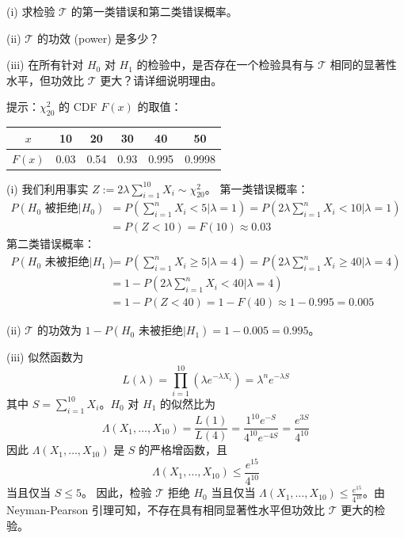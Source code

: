 \begin{questions}
(i) 求检验 $\mathcal{T}$ 的第一类错误和第二类错误概率。

(ii) $\mathcal{T}$ 的功效 (power) 是多少？

(iii) 在所有针对 $H_0$ 对 $H_1$ 的检验中，是否存在一个检验具有与 $\mathcal{T}$ 相同的显著性水平，但功效比 $\mathcal{T}$ 更大？请详细说明理由。

提示：$\chi^2_{20}$ 的 CDF $F(x)$ 的取值：
\begin{center}
\begin{tabular}{c|c|c|c|c|c}
$x$ & 10 & 20 & 30 & 40 & 50 \\ \hline
$F(x)$ & 0.03 & 0.54 & 0.93 & 0.995 & 0.9998
\end{tabular}
\end{center}

\begin{solution}
(i) 我们利用事实 $Z := 2\lambda \sum_{i=1}^{10} X_i \sim \chi^2_{20}$。
第一类错误概率：
\begin{align*}
P(H_0 \text{ 被拒绝} | H_0) &= P\left(\sum_{i=1}^n X_i < 5 \Big| \lambda = 1\right) = P\left(2\lambda \sum_{i=1}^n X_i < 10 \Big| \lambda = 1\right)\\
&= P(Z < 10) = F(10) \approx 0.03
\end{align*}
第二类错误概率：
\begin{align*}
P(H_0 \text{ 未被拒绝} | H_1) &= P\left(\sum_{i=1}^n X_i \ge 5 \Big| \lambda = 4\right) = P\left(2\lambda \sum_{i=1}^n X_i \ge 40 \Big| \lambda = 4\right)\\
&= 1 - P\left(2\lambda \sum_{i=1}^n X_i < 40 \Big| \lambda = 4\right)\\
&= 1 - P(Z < 40) = 1 - F(40) \approx 1 - 0.995 = 0.005
\end{align*}

(ii) $\mathcal{T}$ 的功效为 $1 - P(H_0 \text{ 未被拒绝} | H_1) = 1 - 0.005 = 0.995$。

(iii) 似然函数为
\[
L(\lambda) = \prod_{i=1}^{10} (\lambda e^{-\lambda X_i}) = \lambda^n e^{-\lambda S}
\]
其中 $S = \sum_{i=1}^{10} X_i$。$H_0$ 对 $H_1$ 的似然比为
\[
\Lambda(X_1, \dots, X_{10}) = \frac{L(1)}{L(4)} = \frac{1^{10} e^{-S}}{4^{10} e^{-4S}} = \frac{e^{3S}}{4^{10}}
\]
因此 $\Lambda(X_1, \dots, X_{10})$ 是 $S$ 的严格增函数，且
\[
\Lambda(X_1, \dots, X_{10}) \le \frac{e^{15}}{4^{10}}
\]
当且仅当 $S \le 5$。
因此，检验 $\mathcal{T}$ 拒绝 $H_0$ 当且仅当 $\Lambda(X_1, \dots, X_{10}) \le \frac{e^{15}}{4^{10}}$。由 Neyman-Pearson 引理可知，不存在具有相同显著性水平但功效比 $\mathcal{T}$ 更大的检验。
\end{solution}


\end{questions}
